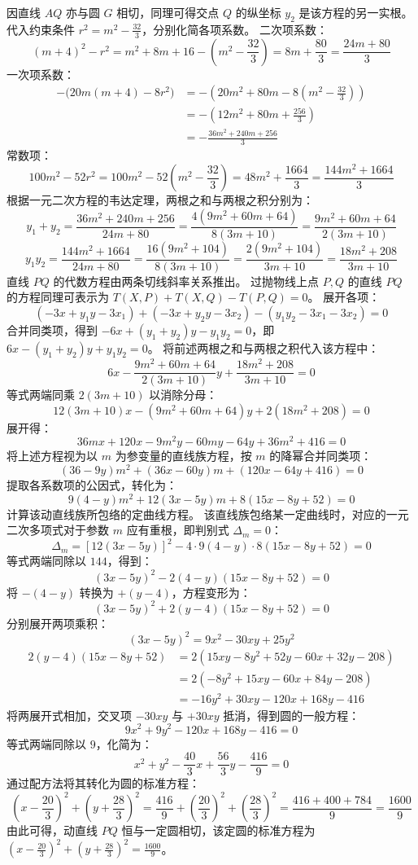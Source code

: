 \begin{solution}
因直线 $AQ$ 亦与圆 $G$ 相切，同理可得交点 $Q$ 的纵坐标 $y_2$ 是该方程的另一实根。
代入约束条件 $r^2 = m^2 - \frac{32}{3}$，分别化简各项系数。
二次项系数：
$$ (m + 4)^2 - r^2 = m^2 + 8m + 16 - \left(m^2 - \frac{32}{3}\right) = 8m + \frac{80}{3} = \frac{24m + 80}{3} $$
一次项系数：
\[
\begin{aligned}
-\big(20m(m + 4) - 8r^2\big)
&= -\left(20m^2 + 80m - 8\left(m^2 - \frac{32}{3}\right)\right) \\
&= -\left(12m^2 + 80m + \frac{256}{3}\right) \\
&= -\frac{36m^2 + 240m + 256}{3}
\end{aligned}
\]
常数项：
$$ 100m^2 - 52r^2 = 100m^2 - 52\left(m^2 - \frac{32}{3}\right) = 48m^2 + \frac{1664}{3} = \frac{144m^2 + 1664}{3} $$
根据一元二次方程的韦达定理，两根之和与两根之积分别为：
$$ y_1 + y_2 = \frac{36m^2 + 240m + 256}{24m + 80} = \frac{4(9m^2 + 60m + 64)}{8(3m + 10)} = \frac{9m^2 + 60m + 64}{2(3m + 10)} $$
$$ y_1 y_2 = \frac{144m^2 + 1664}{24m + 80} = \frac{16(9m^2 + 104)}{8(3m + 10)} = \frac{2(9m^2 + 104)}{3m + 10} = \frac{18m^2 + 208}{3m + 10} $$
直线 $PQ$ 的代数方程由两条切线斜率关系推出。
过抛物线上点 $P, Q$ 的直线 $PQ$ 的方程同理可表示为 $T(X, P) + T(X, Q) - T(P, Q) = 0$。
展开各项：
$$ (-3x + y_1 y - 3x_1) + (-3x + y_2 y - 3x_2) - (y_1 y_2 - 3x_1 - 3x_2) = 0 $$
合并同类项，得到 $-6x + (y_1 + y_2)y - y_1 y_2 = 0$，即 $6x - (y_1 + y_2)y + y_1 y_2 = 0$。
将前述两根之和与两根之积代入该方程中：
$$ 6x - \frac{9m^2 + 60m + 64}{2(3m + 10)} y + \frac{18m^2 + 208}{3m + 10} = 0 $$
等式两端同乘 $2(3m + 10)$ 以消除分母：
$$ 12(3m + 10)x - (9m^2 + 60m + 64)y + 2(18m^2 + 208) = 0 $$
展开得：
$$ 36mx + 120x - 9m^2 y - 60my - 64y + 36m^2 + 416 = 0 $$
将上述方程视为以 $m$ 为参变量的直线族方程，按 $m$ 的降幂合并同类项：
$$ (36 - 9y)m^2 + (36x - 60y)m + (120x - 64y + 416) = 0 $$
提取各系数项的公因式，转化为：
$$ 9(4 - y)m^2 + 12(3x - 5y)m + 8(15x - 8y + 52) = 0 $$
计算该动直线族所包络的定曲线方程。
该直线族包络某一定曲线时，对应的一元二次多项式对于参数 $m$ 应有重根，即判别式 $\Delta_m = 0$：
$$ \Delta_m = \left[12(3x - 5y)\right]^2 - 4 \cdot 9(4 - y) \cdot 8(15x - 8y + 52) = 0 $$
等式两端同除以 $144$，得到：
$$ (3x - 5y)^2 - 2(4 - y)(15x - 8y + 52) = 0 $$
将 $-(4 - y)$ 转换为 $+(y - 4)$，方程变形为：
$$ (3x - 5y)^2 + 2(y - 4)(15x - 8y + 52) = 0 $$
分别展开两项乘积：
$$ (3x - 5y)^2 = 9x^2 - 30xy + 25y^2 $$
\begin{align*}
2(y - 4)(15x - 8y + 52) &= 2(15xy - 8y^2 + 52y - 60x + 32y - 208) \\
&= 2(-8y^2 + 15xy - 60x + 84y - 208) \\
&= -16y^2 + 30xy - 120x + 168y - 416
\end{align*}
将两展开式相加，交叉项 $-30xy$ 与 $+30xy$ 抵消，得到圆的一般方程：
$$ 9x^2 + 9y^2 - 120x + 168y - 416 = 0 $$
等式两端同除以 $9$，化简为：
$$ x^2 + y^2 - \frac{40}{3}x + \frac{56}{3}y - \frac{416}{9} = 0 $$
通过配方法将其转化为圆的标准方程：
$$ \left(x - \frac{20}{3}\right)^2 + \left(y + \frac{28}{3}\right)^2 = \frac{416}{9} + \left(\frac{20}{3}\right)^2 + \left(\frac{28}{3}\right)^2 = \frac{416 + 400 + 784}{9} = \frac{1600}{9} $$
由此可得，动直线 $PQ$ 恒与一定圆相切，该定圆的标准方程为 $\left(x - \frac{20}{3}\right)^2 + \left(y + \frac{28}{3}\right)^2 = \frac{1600}{9}$。


\end{solution}
